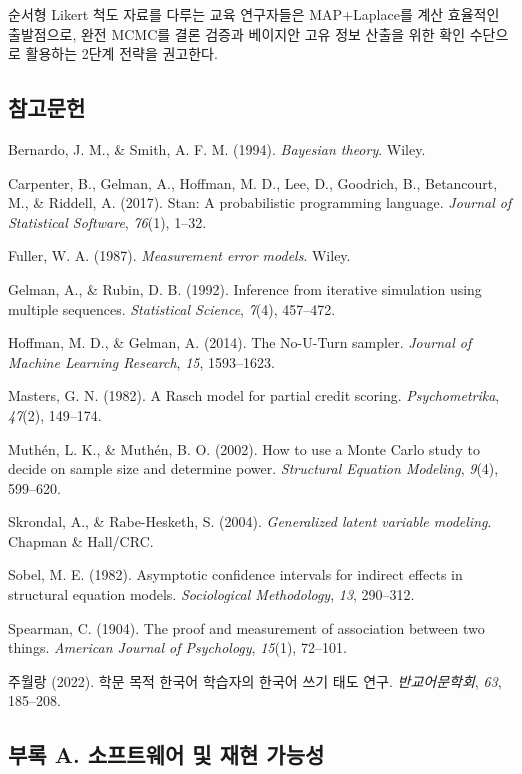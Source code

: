 \documentclass[a4paper,10pt]{oblivoir}
\begin{document}
순서형 Likert 척도 자료를 다루는 교육 연구자들은 MAP+Laplace를 계산 효율적인 출발점으로, 완전 MCMC를 결론 검증과 베이지안 고유 정보 산출을 위한 확인 수단으로 활용하는 2단계 전략을 권고한다.


\subsection{참고문헌}

Bernardo, J. M., \& Smith, A. F. M. (1994). \textit{Bayesian theory}. Wiley.

Carpenter, B., Gelman, A., Hoffman, M. D., Lee, D., Goodrich, B., Betancourt, M., \& Riddell, A. (2017). Stan: A probabilistic programming language. \textit{Journal of Statistical Software}, \textit{76}(1), 1--32.

Fuller, W. A. (1987). \textit{Measurement error models}. Wiley.

Gelman, A., \& Rubin, D. B. (1992). Inference from iterative simulation using multiple sequences. \textit{Statistical Science}, \textit{7}(4), 457--472.

Hoffman, M. D., \& Gelman, A. (2014). The No-U-Turn sampler. \textit{Journal of Machine Learning Research}, \textit{15}, 1593--1623.

Masters, G. N. (1982). A Rasch model for partial credit scoring. \textit{Psychometrika}, \textit{47}(2), 149--174.

Muth\'{e}n, L. K., \& Muth\'{e}n, B. O. (2002). How to use a Monte Carlo study to decide on sample size and determine power. \textit{Structural Equation Modeling}, \textit{9}(4), 599--620.

Skrondal, A., \& Rabe-Hesketh, S. (2004). \textit{Generalized latent variable modeling}. Chapman \& Hall/CRC.

Sobel, M. E. (1982). Asymptotic confidence intervals for indirect effects in structural equation models. \textit{Sociological Methodology}, \textit{13}, 290--312.

Spearman, C. (1904). The proof and measurement of association between two things. \textit{American Journal of Psychology}, \textit{15}(1), 72--101.

주월랑 (2022). 학문 목적 한국어 학습자의 한국어 쓰기 태도 연구. \textit{반교어문학회}, \textit{63}, 185--208.


\subsection{부록 A. 소프트웨어 및 재현 가능성}
\end{document}
